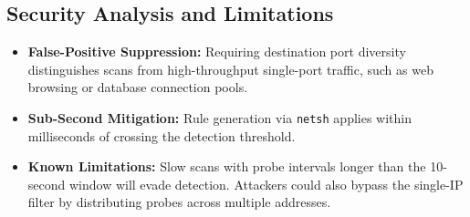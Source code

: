 \documentclass[11pt,a4paper]{article}
\begin{document}
\subsection{Security Analysis and Limitations}
\begin{itemize}[nosep, itemsep=2pt, leftmargin=1.4em]
    \item \textbf{False-Positive Suppression:} Requiring destination port diversity distinguishes scans from high-throughput single-port traffic, such as web browsing or database connection pools.
    \item \textbf{Sub-Second Mitigation:} Rule generation via \texttt{netsh} applies within milliseconds of crossing the detection threshold.
    \item \textbf{Known Limitations:} Slow scans with probe intervals longer than the 10-second window will evade detection. Attackers could also bypass the single-IP filter by distributing probes across multiple addresses.
\end{itemize}
\end{document}
